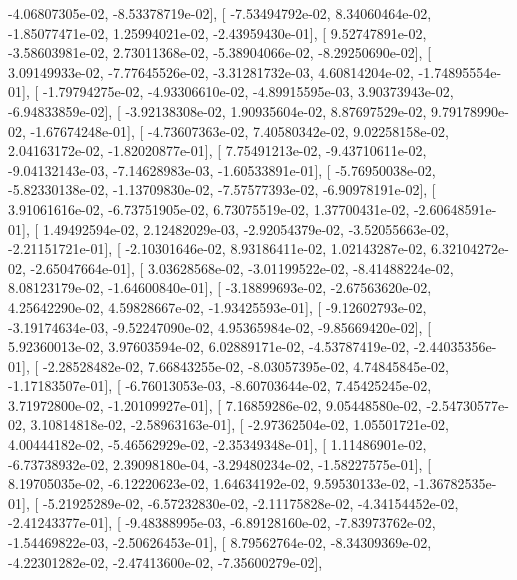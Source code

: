 \documentclass{article}
\begin{document}
         -4.06807305e-02,  -8.53378719e-02],
       [ -7.53494792e-02,   8.34060464e-02,  -1.85077471e-02,
          1.25994021e-02,  -2.43959430e-01],
       [  9.52747891e-02,  -3.58603981e-02,   2.73011368e-02,
         -5.38904066e-02,  -8.29250690e-02],
       [  3.09149933e-02,  -7.77645526e-02,  -3.31281732e-03,
          4.60814204e-02,  -1.74895554e-01],
       [ -1.79794275e-02,  -4.93306610e-02,  -4.89915595e-03,
          3.90373943e-02,  -6.94833859e-02],
       [ -3.92138308e-02,   1.90935604e-02,   8.87697529e-02,
          9.79178990e-02,  -1.67674248e-01],
       [ -4.73607363e-02,   7.40580342e-02,   9.02258158e-02,
          2.04163172e-02,  -1.82020877e-01],
       [  7.75491213e-02,  -9.43710611e-02,  -9.04132143e-03,
         -7.14628983e-03,  -1.60533891e-01],
       [ -5.76950038e-02,  -5.82330138e-02,  -1.13709830e-02,
         -7.57577393e-02,  -6.90978191e-02],
       [  3.91061616e-02,  -6.73751905e-02,   6.73075519e-02,
          1.37700431e-02,  -2.60648591e-01],
       [  1.49492594e-02,   2.12482029e-03,  -2.92054379e-02,
         -3.52055663e-02,  -2.21151721e-01],
       [ -2.10301646e-02,   8.93186411e-02,   1.02143287e-02,
          6.32104272e-02,  -2.65047664e-01],
       [  3.03628568e-02,  -3.01199522e-02,  -8.41488224e-02,
          8.08123179e-02,  -1.64600840e-01],
       [ -3.18899693e-02,  -2.67563620e-02,   4.25642290e-02,
          4.59828667e-02,  -1.93425593e-01],
       [ -9.12602793e-02,  -3.19174634e-03,  -9.52247090e-02,
          4.95365984e-02,  -9.85669420e-02],
       [  5.92360013e-02,   3.97603594e-02,   6.02889171e-02,
         -4.53787419e-02,  -2.44035356e-01],
       [ -2.28528482e-02,   7.66843255e-02,  -8.03057395e-02,
          4.74845845e-02,  -1.17183507e-01],
       [ -6.76013053e-03,  -8.60703644e-02,   7.45425245e-02,
          3.71972800e-02,  -1.20109927e-01],
       [  7.16859286e-02,   9.05448580e-02,  -2.54730577e-02,
          3.10814818e-02,  -2.58963163e-01],
       [ -2.97362504e-02,   1.05501721e-02,   4.00444182e-02,
         -5.46562929e-02,  -2.35349348e-01],
       [  1.11486901e-02,  -6.73738932e-02,   2.39098180e-04,
         -3.29480234e-02,  -1.58227575e-01],
       [  8.19705035e-02,  -6.12220623e-02,   1.64634192e-02,
          9.59530133e-02,  -1.36782535e-01],
       [ -5.21925289e-02,  -6.57232830e-02,  -2.11175828e-02,
         -4.34154452e-02,  -2.41243377e-01],
       [ -9.48388995e-03,  -6.89128160e-02,  -7.83973762e-02,
         -1.54469822e-03,  -2.50626453e-01],
       [  8.79562764e-02,  -8.34309369e-02,  -4.22301282e-02,
         -2.47413600e-02,  -7.35600279e-02],
\end{document}
